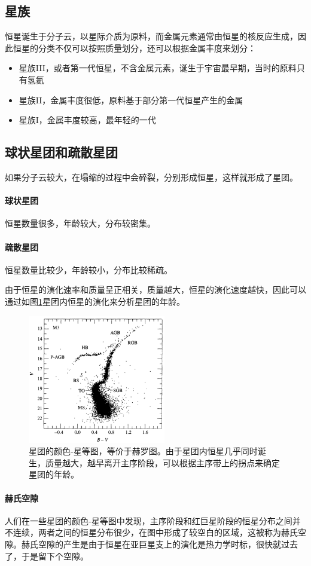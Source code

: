 \documentclass[openany]{ctexbook}
\begin{document}
\subsection{星族}
恒星诞生于分子云，以星际介质为原料，而金属元素通常由恒星的核反应生成，因此恒星的分类不仅可以按照质量划分，还可以根据金属丰度来划分：
\begin{itemize}
  \item 星族III，或者第一代恒星，不含金属元素，诞生于宇宙最早期，当时的原料只有氢氦
  \item 星族II，金属丰度很低，原料基于部分第一代恒星产生的金属
  \item 星族I，金属丰度较高，最年轻的一代
\end{itemize}

\subsection{球状星团和疏散星团}
如果分子云较大，在塌缩的过程中会碎裂，分别形成恒星，这样就形成了星团。
\paragraph{球状星团}
恒星数量很多，年龄较大，分布较密集。
\paragraph{疏散星团}
恒星数量比较少，年龄较小，分布比较稀疏。

由于恒星的演化速率和质量呈正相关，质量越大，恒星的演化速度越快，因此可以通过如图\ref{fig:cluster}星团内恒星的演化来分析星团的年龄。
\begin{figure}[hbt]
  \centering
  \includegraphics[width=6cm]{chapters/13/cluster}
  \caption{星团的颜色-星等图，等价于赫罗图。由于星团内恒星几乎同时诞生，质量越大，越早离开主序阶段，可以根据主序带上的拐点来确定星团的年龄。}
  \label{fig:cluster}
\end{figure}

\paragraph{赫氏空隙}
人们在一些星团的颜色-星等图中发现，主序阶段和红巨星阶段的恒星分布之间并不连续，两者之间的恒星分布很少，在图中形成了较空白的区域，这被称为赫氏空隙。赫氏空隙的产生是由于恒星在亚巨星支上的演化是热力学时标，很快就过去了，于是留下个空隙。
\end{document}
